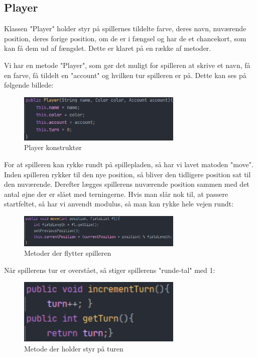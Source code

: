 \subsection{Player}
Klassen "Player" holder styr på spillernes tildelte farve, deres navn, nuværende position, deres forige position, om de er i fængsel og har de et chancekort, som kan få dem ud af fængslet. Dette er klaret på en række af metoder.

Vi har en metode "Player", som gør det muligt for spilleren at skrive et navn, få en farve, få tildelt en "account" og hvilken tur spilleren er på. Dette kan ses på følgende billede:
\begin{figure}[H]
    \centering
    \includegraphics[width=0.7\textwidth]{sources/7_implementering/Player.PNG}
    \caption{Player konstruktør}
    \label{fig:PlayerKonstruktør}
\end{figure}
For at spilleren kan rykke rundt på spillepladen, så har vi lavet matoden "move". Inden spilleren rykker til den nye position, så bliver den tidligere position sat til den nuværende. Derefter lægges spillerens nuværende position sammen med det antal øjne der er slået med terningerne. Hvis man slår nok til, at passere startfeltet, så har vi anvendt modulus, så man kan rykke hele vejen rundt:
\begin{figure}[H]
    \centering
    \includegraphics[width=0.7\textwidth]{sources/7_implementering/Move.PNG}
    \caption{Metoder der flytter spilleren}
    \label{fig:PlayerMove}
\end{figure}
Når spillerens tur er overstået, så stiger spillerens "runde-tal" med 1:
\begin{figure}[H]
    \centering
    \includegraphics[width=0.7\textwidth]{sources/7_implementering/Turn.PNG}
    \caption{Metode der holder styr på turen}
    \label{fig:TurnKeeper}
\end{figure}
